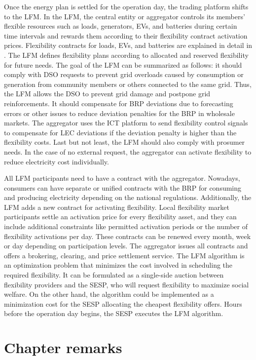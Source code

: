 Once the energy plan is settled for the operation day, the trading platform shifts to the LFM. In the LFM, the central entity or aggregator controls its members' flexible resources such as loads, generators, EVs, and batteries during certain time intervals and rewards them according to their flexibility contract activation prices. Flexibility contracts for loads, EVs, and batteries are explained in detail in \cite{Olivella2018}. The LFM defines flexibility plans according to allocated and reserved flexibility for future needs. The goal of the LFM can be summarized as follows: it should comply with DSO requests to prevent grid overloads caused by consumption
or generation from community members or others connected to the same grid. Thus, the LFM allows the DSO to prevent grid damage and postpone grid reinforcements. It should compensate for BRP deviations due to forecasting errors or other issues to reduce deviation penalties for the BRP in wholesale markets. The aggregator uses the ICT platform to send flexibility control signals to compensate for LEC deviations if the deviation penalty is higher than the flexibility costs. Last but not least, the LFM should also comply with
prosumer needs. In the case of no external request, the aggregator can activate flexibility to reduce electricity cost individually.

All LFM participants need to have a contract with the aggregator. Nowadays, consumers can have separate or unified contracts with the BRP for consuming and producing electricity depending on the national regulations. Additionally, the LFM adds a new contract for activating flexibility. Local flexibility market participants settle an activation price for every flexibility asset, and they can include additional constraints like permitted activation periods or the number of flexibility activations per day. These contracts can be renewed every month, week or day depending on participation levels. The aggregator issues all contracts and offers a
brokering, clearing, and price settlement service. The LFM algorithm is an optimization problem that minimizes the cost involved in scheduling the required flexibility. It can be formulated as a single-side auction between flexibility providers and the SESP, who will request flexibility to maximize social welfare. On the other hand, the algorithm could be implemented as a minimization cost for the SESP allocating the cheapest flexibility offers. Hours before the operation day begins, the SESP executes the LFM algorithm.

\newpage
\section{Chapter remarks} \label{sec:conclusions}

